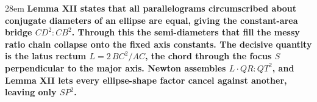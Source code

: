 \documentclass[border=4pt]{standalone}
\begin{document}
\begin{varwidth}{28em}
\large\bfseries
Lemma XII states that all parallelograms circumscribed about \textcolor{parteal}{conjugate      diameters} of an ellipse are equal, giving the constant-area bridge $CD^2 : CB^2$.      Through this the \textcolor{parteal}{semi-diameters} that fill the messy ratio chain collapse      onto the fixed axis constants. The decisive quantity is the \textcolor{latusred}{latus rectum      $L = 2\,BC^2/AC$}, the chord through the focus $S$ perpendicular to the major axis.      Newton assembles $L\cdot QR : QT^2$, and Lemma XII lets every ellipse-shape factor      cancel against another, leaving only $SP^2$.
\end{varwidth}
\end{document}
